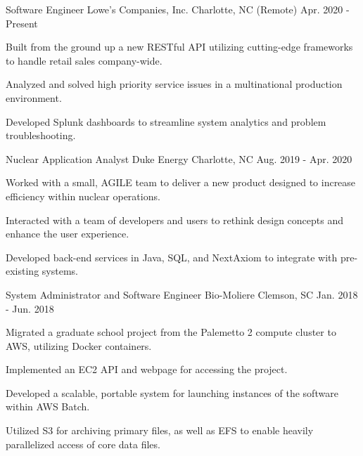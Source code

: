 

\begin{cventries}

  \cventry
    {Software Engineer}
    {Lowe's Companies, Inc.}
    {Charlotte, NC (Remote)}
    {Apr. 2020 - Present}
    {
        \begin{cvitems}
            \item {Built from the ground up a new RESTful API utilizing cutting-edge frameworks to handle retail sales company-wide.}
            \item {Analyzed and solved high priority service issues in a multinational production environment.}
            \item {Developed Splunk dashboards to streamline system analytics and problem troubleshooting.}
        \end{cvitems}
    }
    
  \cventry
    {Nuclear Application Analyst}
    {Duke Energy}
    {Charlotte, NC}
    {Aug. 2019 - Apr. 2020}
    {
        \begin{cvitems}
            \item {Worked with a small, AGILE team to deliver a new product designed to increase efficiency within nuclear operations.}
            \item {Interacted with a team of developers and users to rethink design concepts and enhance the user experience.}
            \item {Developed back-end services in Java, SQL, and NextAxiom to integrate with pre-existing systems.}
        \end{cvitems}
    }
    
  \cventry
    {System Administrator and Software Engineer}
    {Bio-Moliere}
    {Clemson, SC}
    {Jan. 2018 - Jun. 2018}
    {
      \begin{cvitems}
        \item {Migrated a graduate school project from the Palemetto 2 compute cluster to AWS, utilizing Docker containers.}
        \item {Implemented an EC2 API and webpage for accessing the project.}
        \item {Developed a scalable, portable system for launching instances of the software within AWS Batch.}
        \item {Utilized S3 for archiving primary files, as well as EFS to enable heavily parallelized access of core data files.}
      \end{cvitems}
    }

\end{cventries}
